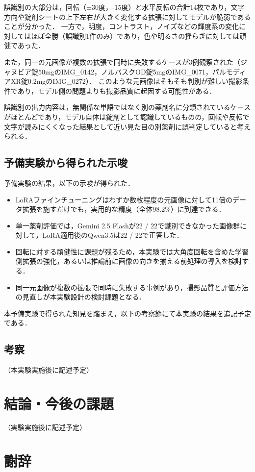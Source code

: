 \documentclass{jsarticle}
\begin{document}
誤識別の大部分は，回転（±30度，-15度）と水平反転の合計14枚であり，文字方向や錠剤シートの上下左右が大きく変化する拡張に対してモデルが脆弱であることが分かった．
一方で，明度，コントラスト，ノイズなどの輝度系の変化に対してはほぼ全勝（誤識別1件のみ）であり，色や明るさの揺らぎに対しては頑健であった．

また，同一の元画像が複数の拡張で同時に失敗するケースが3例観察された（ジャヌビア錠50mgのIMG\_0142，ノルバスクOD錠5mgのIMG\_0071，パルモディアXR錠0.2mgのIMG\_0272）．
このような元画像はそもそも判別が難しい撮影条件であり，モデル側の問題よりも撮影品質に起因する可能性がある．

誤識別の出力内容は，無関係な単語ではなく別の薬剤名に分類されているケースがほとんどであり，モデル自体は錠剤として認識しているものの，回転や反転で文字が読みにくくなった結果として近い見た目の別薬剤に誤判定していると考えられる．

\subsection{予備実験から得られた示唆}

予備実験の結果，以下の示唆が得られた．

\begin{itemize}
  \item LoRAファインチューニングはわずか数枚程度の元画像に対して11倍のデータ拡張を施すだけでも，実用的な精度（全体98.2\%）に到達できる．
  \item 単一薬剤評価では，Gemini 2.5 Flashが22 / 22で識別できなかった画像群に対して，LoRA適用後のQwen3.5は22 / 22で正答した．
  \item 回転に対する頑健性に課題が残るため，本実験では大角度回転を含めた学習側拡張の強化，あるいは推論前に画像の向きを揃える前処理の導入を検討する．
  \item 同一元画像が複数の拡張で同時に失敗する事例があり，撮影品質と評価方法の見直しが本実験設計の検討課題となる．
\end{itemize}

本予備実験で得られた知見を踏まえ，以下の考察節にて本実験の結果を追記予定である．

\subsection{考察}

（本実験実施後に記述予定）

\newpage

\section{結論・今後の課題}\label{sec5}

（実験実施後に記述予定）

\newpage
\section*{謝辞}

\newpage



\end{document}
